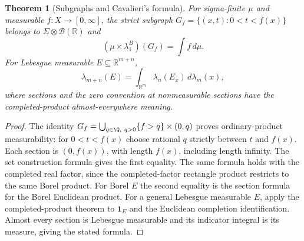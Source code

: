 \documentclass[11pt,oneside,openany]{book}
\newtheorem{theorem}{Theorem}[chapter]
\theoremstyle{definition}
\theoremstyle{remark}
\newcommand{\R}{\mathbb R}\newcommand{\C}{\mathbb C}
\newcommand{\BB}{\mathcal B}\newcommand{\SSS}{\mathcal S}
\newcommand{\one}{\mathbf1}\newcommand{\ind}[1]{\mathbf1_{#1}}
\newcommand{\Eplus}{[0,\infty]}
\newcommand{\family}[1]{}
\begin{document}
\begin{theorem}[Subgraphs and Cavalieri's formula]
\family{D11.08.subgraph_cavalieri}\label{d11:08:subgraph-cavalieri}
For sigma-finite $\mu$ and measurable $f:X\to\Eplus$, the strict
subgraph $G_f=\{(x,t):0<t<f(x)\}$ belongs to
$\Sigma\otimes\BB(\R)$ and
\[
 (\mu\times\lambda_1^B)(G_f)=\int f\,d\mu.
\]
For Lebesgue measurable $E\subseteq\R^{m+n}$,
\[
 \lambda_{m+n}(E)=\int_{\R^m}\lambda_n(E_x)\,d\lambda_m(x),
\]
where sections and the zero convention at nonmeasurable sections have
the completed-product almost-everywhere meaning.
\end{theorem}
\begin{proof}
The identity
$G_f=\bigcup_{q\in\Q,\ q>0}\{f>q\}\times(0,q)$ proves ordinary-product
measurability: for $0<t<f(x)$ choose rational $q$ strictly between $t$
and $f(x)$. Each section is $(0,f(x))$, with length $f(x)$, including
length infinity. The set construction formula gives the first equality.
The same formula holds with the completed real factor, since the
completed-factor rectangle product restricts to the same Borel product.
For Borel $E$ the second equality is the section formula for the Borel
Euclidean product. For a general Lebesgue measurable $E$, apply the
completed-product theorem to $\one_E$ and the Euclidean completion
identification. Almost every section is Lebesgue measurable and its
indicator integral is its measure, giving the stated formula.
\end{proof}
\end{document}
